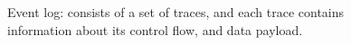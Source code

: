 \begin{figure}[1htbp]
	\begin{center}
		\caption[Event log]{Event log: consists of a set of traces, and each trace contains information about its control flow, and data payload.}
		\label{fig:el}
	\end{center}
\end{figure}


